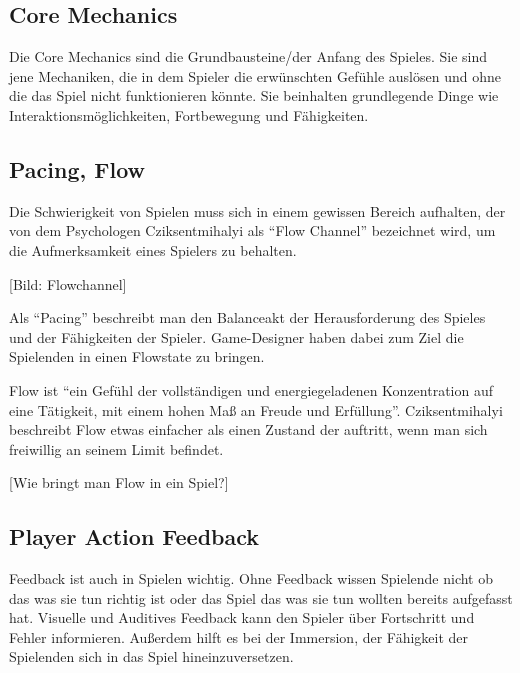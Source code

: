 \subsection{Core Mechanics}

Die Core Mechanics sind die Grundbausteine/der Anfang des Spieles. Sie sind jene Mechaniken, die in dem Spieler die erwünschten Gefühle auslösen und ohne die das Spiel nicht funktionieren könnte. Sie beinhalten grundlegende Dinge wie Interaktionsmöglichkeiten, Fortbewegung und Fähigkeiten.

\subsection{Pacing, Flow}

Die Schwierigkeit von Spielen muss sich in einem gewissen Bereich aufhalten, der von dem Psychologen Cziksentmihalyi als "`Flow Channel"' bezeichnet wird, um die Aufmerksamkeit eines Spielers zu behalten.\cite[S.205]{_art_of_gamedesign}

[Bild: Flowchannel]

Als "`Pacing"' beschreibt man den Balanceakt der Herausforderung des Spieles und der Fähigkeiten der Spieler. Game-Designer haben dabei zum Ziel die Spielenden in einen Flowstate zu bringen.

Flow ist "`ein Gefühl der vollständigen und energiegeladenen Konzentration auf eine Tätigkeit, mit einem hohen Maß an Freude und Erfüllung"'\cite[S.204]{_art_of_gamedesign}.
Cziksentmihalyi beschreibt Flow etwas einfacher als einen Zustand der auftritt, wenn man sich freiwillig an seinem Limit befindet\cite{_flow}.

[Wie bringt man Flow in ein Spiel?]\cite{_theory_of_fun}

\subsection{Player Action Feedback}

Feedback ist auch in Spielen wichtig. Ohne Feedback wissen Spielende nicht ob das was sie tun richtig ist oder das Spiel das was sie tun wollten bereits aufgefasst hat. Visuelle und Auditives Feedback kann den Spieler über Fortschritt und Fehler informieren. Außerdem hilft es bei der Immersion, der Fähigkeit der Spielenden sich in das Spiel hineinzuversetzen.
